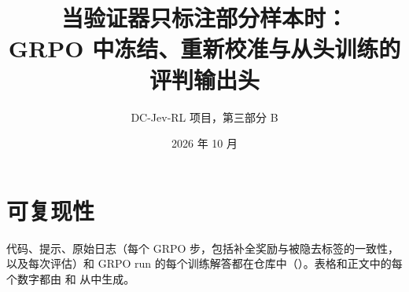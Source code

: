 \documentclass[11pt]{ctexart}
\title{当验证器只标注部分样本时：\\GRPO 中冻结、重新校准与从头训练的评判输出头}
\author{DC-Jev-RL 项目，第三部分 B}
\date{2026 年 10 月}
\begin{document}
\maketitle

\begin{abstract}

\end{abstract}






\section*{可复现性}
代码、提示、原始日志（每个 GRPO 步，包括补全奖励与被隐去标签的一致性，以及每次评估）和 GRPO run 的每个训练解答都在仓库中（）。表格和正文中的每个数字都由  和  从中生成。



\end{document}
